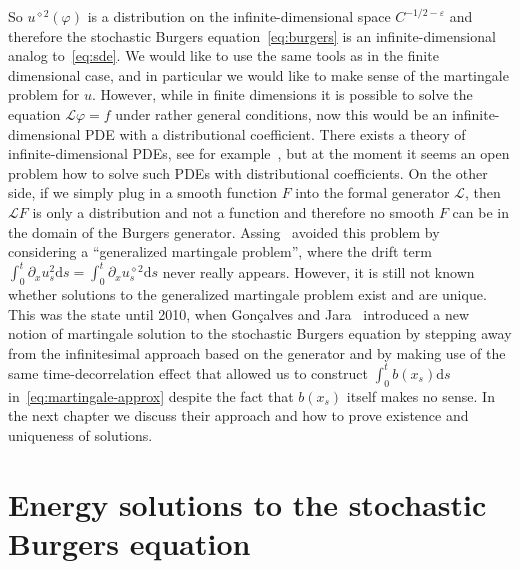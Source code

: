 \documentclass[a4paper,11pt]{article}
\newcommand{\LL}{\mathcal{L}}
\newcommand{\1}{\mathds{1}}
\newcommand{\dd}{\mathrm{d}}
\begin{document}
So $u^{\diamond 2}(\varphi)$ is a distribution on the infinite-dimensional space $C^{-1/2-\varepsilon}$ and therefore the stochastic Burgers equation~\eqref{eq:burgers} is an infinite-dimensional analog to~\eqref{eq:sde}. We would like to use the same tools as in the finite dimensional case, and in particular we would like to make sense of the martingale problem for $u$. However, while in finite dimensions it is possible to solve the equation $\LL \varphi = f$ under rather general conditions, now this would be an infinite-dimensional PDE with a distributional coefficient. There exists a theory of infinite-dimensional PDEs, see for example~\cite{DPZ02, BKRS15}, but at the moment it seems an open problem how to solve such PDEs with distributional coefficients. On the other side, if we simply plug in a smooth function $F$ into the formal generator $\LL$, then $\LL F$ is only a distribution and not a function and therefore no smooth $F$ can be in the domain of the Burgers generator. Assing~\cite{A02} avoided this problem by considering a ``generalized martingale problem'', where the drift term $\int_0^t \partial_x u_s^2 \dd s = \int_0^t \partial_x u_s^{\diamond 2} \dd s$ never really appears. However, it is still not known whether solutions to the generalized martingale problem exist and are unique. This was the state until 2010, when Gon\c calves and Jara~\cite{GJ10} introduced a new notion of martingale solution to the stochastic Burgers equation by stepping away from the infinitesimal approach based on the generator and by making use of the same time-decorrelation effect that allowed us to construct $\int_0^t b(x_s) \dd s$ in~\eqref{eq:martingale-approx} despite the fact that $b(x_s)$ itself makes no sense. In the next chapter we discuss their approach and how to prove existence and uniqueness of solutions.
  
\section{Energy solutions to the stochastic Burgers equation}
\end{document}
